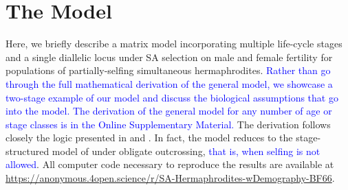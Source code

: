 \documentclass[11pt]{article}
\begin{document}



\section*{The Model}

Here, we briefly describe a matrix model incorporating multiple life-cycle stages and a single diallelic locus under SA selection on male and female fertility for populations of partially-selfing simultaneous hermaphrodites. \textcolor{blue}{Rather than go through the full mathematical derivation of the general model, we showcase a two-stage example of our model and discuss the biological assumptions that go into the model. The derivation of the general model for any number of age or stage classes is in the Online Supplementary Material.} The derivation follows closely the logic presented in \citet{deVriesCaswell2019a} and \citet{deVriesCaswell2019b}. In fact, the model reduces to the stage-structured model of \citet{deVriesCaswell2019a} under obligate outcrossing, \textcolor{blue}{that is, when selfing is not allowed}. All computer code necessary to reproduce the results are available at \url{https://anonymous.4open.science/r/SA-Hermaphrodites-wDemography-BF66}.%
\end{document}
